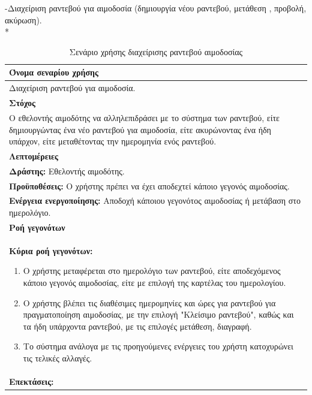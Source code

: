 			
-Διαχείριση ραντεβού για αιμοδοσία (δημιουργία νέου ραντεβού, μετάθεση , προβολή, ακύρωση).
\\*

\begin{table}[H]
	\begin{center}
	    \begin{tabular}{|p{\dimexpr \linewidth-2\tabcolsep}|}
	    \hline
	    \rowcolor{grayy}
	    \textbf{Όνομα σεναρίου χρήσης}
	    \\ \hline    
	     Διαχείριση ραντεβού για αιμοδοσία.
	     \\ \hline
	    \rowcolor{grayy}
	    \textbf{\textbf{Στόχος}}
	    \\ \hline
	 	 Ο εθελοντής αιμοδότης να αλληλεπιδράσει με το σύστημα των ραντεβού, είτε δημιουργώντας ένα νέο ραντεβού για αιμοδοσία, είτε ακυρώνοντας ένα ήδη υπάρχον, είτε μεταθέτοντας την ημερομηνία ενός ραντεβού.
	    \\ \hline
	    \rowcolor{grayy}
	    \textbf{Λεπτομέρειες}
	    \\ \hline
		\textbf{Δράστης:} Εθελοντής αιμοδότης.
		\\*
		\textbf{Προϋποθέσεις:} Ο χρήστης πρέπει να έχει αποδεχτεί κάποιο γεγονός αιμοδοσίας.
		\\*
		\textbf{Ενέργεια ενεργοποίησης:} Αποδοχή κάποιου γεγονότος αιμοδοσίας ή μετάβαση στο ημερολόγιο.
		\\ \hline

		\rowcolor{grayy}    
	    \textbf{Ροή γεγονότων}
	    \\ \hline
		\textbf{Κύρια ροή γεγονότων:}
		\begin{enumerate}
			\item	 Ο χρήστης μεταφέρεται στο ημερολόγιο των ραντεβού, είτε αποδεχόμενος κάποιο γεγονός αιμοδοσίας, είτε με επιλογή της καρτέλας του ημερολογίου.
			\item  Ο χρήστης βλέπει τις διαθέσιμες ημερομηνίες και ώρες για ραντεβού για πραγματοποίηση αιμοδοσίας, με την επιλογή "Κλείσιμο ραντεβού", καθώς και τα ήδη υπάρχοντα ραντεβού, με τις επιλογές μετάθεση, διαγραφή.
			\item Το σύστημα ανάλογα με τις προηγούμενες ενέργειες του χρήστη κατοχυρώνει τις τελικές αλλαγές.
		\end{enumerate}
		\\ \hline
		\textbf{Επεκτάσεις:}
		   \\ \hline
	    \end{tabular}
	    \caption{Σενάριο χρήσης διαχείρισης ραντεβού αιμοδοσίας}
	    \label{tab:blood_donation_reservation_management} 
	\end{center}
\end{table}	
			
